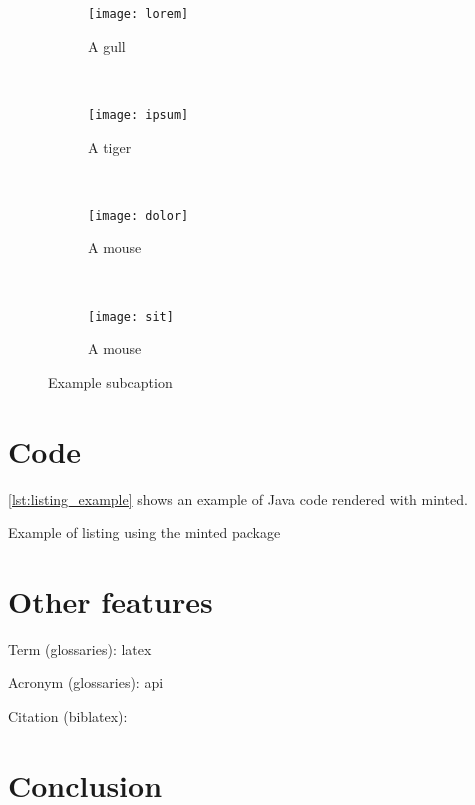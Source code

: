 \begin{figure}[H]
	\centering
	\begin{subfigure}[b]{0.45\textwidth}
		\texttt{[image: lorem]}
		\caption{A gull}
		\label{fig:lorem}
	\end{subfigure}
	~ %
	\begin{subfigure}[b]{0.45\textwidth}
		\texttt{[image: ipsum]}
		\caption{A tiger}
		\label{fig:ipsum}
	\end{subfigure}
	~ %
	\begin{subfigure}[b]{0.45\textwidth}
		\texttt{[image: dolor]}
		\caption{A mouse}
		\label{fig:dolor}
	\end{subfigure}
	~ %
	\begin{subfigure}[b]{0.45\textwidth}
		\texttt{[image: sit]}
		\caption{A mouse}
		\label{fig:sit}
	\end{subfigure}
	\caption{Example subcaption}\label{fig:animals}
\end{figure}


\section{Code}

\autoref{lst:listing_example} shows an example of Java code rendered with minted.

\begin{listing}
	\caption{Example of listing using the minted package}
	\label{lst:listing_example}
\end{listing}

\section{Other features}

Term (glossaries): \gls{latex}

Acronym (glossaries): \gls{api}

Citation (biblatex): \cite{castello_deep_2019}

\section{Conclusion}

\blindtext
